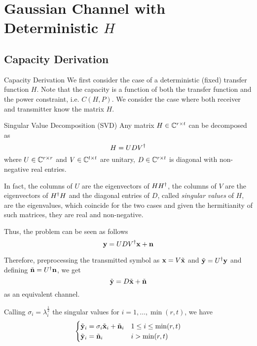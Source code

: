 \section{Gaussian Channel with Deterministic $H$}
\subsection{Capacity Derivation}
\begin{frame}[allowframebreaks]{Capacity Derivation}
We first consider the case of a deterministic (fixed) transfer function $H$. Note that the capacity is a function of both the transfer function and the power constraint, i.e. $C(H,P)$. We consider the case where both receiver and transmitter know the matrix $H$.

\begin{block}{Singular Value Decomposition (SVD)}\justify
Any matrix $H\in \mathbb{C}^{r\times t}$ can be decomposed as
$$H = UDV^\dagger$$
where $U\in \mathbb{C}^{r\times r}$ and $V \in \mathbb{C}^{t\times t}$ are unitary, $D\in \mathbb{C}^{r\times t}$ is diagonal with non-negative real entries.

In fact, the columns of $U$ are the eigenvectors of $HH^\dagger$, the columns of $V$ are the eigenvectors of $H^\dagger H$ and the diagonal entries of $D$, called \textit{singular values} of $H$, are the eigenvalues, which coincide for the two cases and given the hermitianity of such matrices, they are real and non-negative.
\end{block}

\framebreak

Thus, the problem can be seen as follows
$$\vb{y} = UDV^\dagger\vb{x} + \vb{n}$$

Therefore, preprocessing the transmitted symbol as $\vb{x} = V\tilde{\vb{x}}$ and $\tilde{\vb{y}}=U^\dagger\vb{y}$ and defining $\tilde{\vb{n}} = U^\dagger\vb{n}$, we get
$$\tilde{\vb{y}} = D\tilde{\vb{x}} + \tilde{\vb{n}}$$
as an equivalent channel.

\myspace
Calling $\sigma_i = \lambda_i^{\frac{1}{2}}$ the singular values for $i=1,\ldots,\min(r,t)$, we have
\begin{equation*}
\begin{cases}
\tilde{\vb{y}}_i = \sigma_i \tilde{\vb{x}}_i + \tilde{\vb{n}}_i & 1\leq i\leq \min(r,t)\\
\tilde{\vb{y}}_i = \tilde{\vb{n}}_i & i > \min(r,t)
\end{cases}
\end{equation*}


\end{frame}
